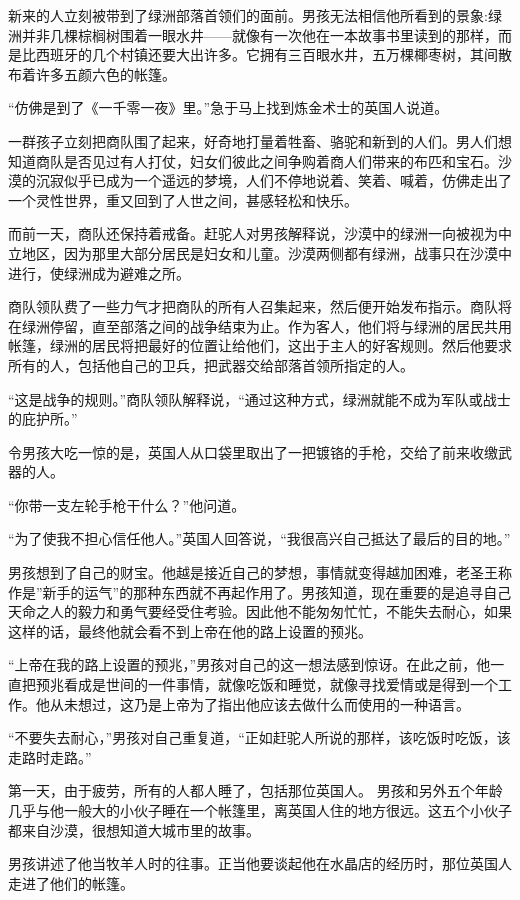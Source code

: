 \documentclass[twoside,openany]{book}
\begin{document}
新来的人立刻被带到了绿洲部落首领们的面前。男孩无法相信他所看到的景象:绿洲并非几棵棕榈树围着一眼水井——就像有一次他在一本故事书里读到的那样，而是比西班牙的几个村镇还要大出许多。它拥有三百眼水井，五万棵椰枣树，其间散布着许多五颜六色的帐篷。

“仿佛是到了《一千零一夜》里。”急于马上找到炼金术士的英国人说道。

一群孩子立刻把商队围了起来，好奇地打量着牲畜、骆驼和新到的人们。男人们想知道商队是否见过有人打仗，妇女们彼此之间争购着商人们带来的布匹和宝石。沙漠的沉寂似乎已成为一个遥远的梦境，人们不停地说着、笑着、喊着，仿佛走出了一个灵性世界，重又回到了人世之间，甚感轻松和快乐。

而前一天，商队还保持着戒备。赶驼人对男孩解释说，沙漠中的绿洲一向被视为中立地区，因为那里大部分居民是妇女和儿童。沙漠两侧都有绿洲，战事只在沙漠中进行，使绿洲成为避难之所。

商队领队费了一些力气才把商队的所有人召集起来，然后便开始发布指示。商队将在绿洲停留，直至部落之间的战争结束为止。作为客人，他们将与绿洲的居民共用帐篷，绿洲的居民将把最好的位置让给他们，这出于主人的好客规则。然后他要求所有的人，包括他自己的卫兵，把武器交给部落首领所指定的人。

“这是战争的规则。”商队领队解释说，“通过这种方式，绿洲就能不成为军队或战士的庇护所。”

令男孩大吃一惊的是，英国人从口袋里取出了一把镀铬的手枪，交给了前来收缴武器的人。

“你带一支左轮手枪干什么？”他问道。

“为了使我不担心信任他人。”英国人回答说，“我很高兴自己抵达了最后的目的地。”

男孩想到了自己的财宝。他越是接近自己的梦想，事情就变得越加困难，老圣王称作是”新手的运气”的那种东西就不再起作用了。男孩知道，现在重要的是追寻自己天命之人的毅力和勇气要经受住考验。因此他不能匆匆忙忙，不能失去耐心，如果这样的话，最终他就会看不到上帝在他的路上设置的预兆。

“上帝在我的路上设置的预兆，”男孩对自己的这一想法感到惊讶。在此之前，他一直把预兆看成是世间的一件事情，就像吃饭和睡觉，就像寻找爱情或是得到一个工作。他从未想过，这乃是上帝为了指出他应该去做什么而使用的一种语言。

“不要失去耐心，”男孩对自己重复道，“正如赶驼人所说的那样，该吃饭时吃饭，该走路时走路。”

第一天，由于疲劳，所有的人都人睡了，包括那位英国人。 男孩和另外五个年龄几乎与他一般大的小伙子睡在一个帐篷里，离英国人住的地方很远。这五个小伙子都来自沙漠，很想知道大城市里的故事。

男孩讲述了他当牧羊人时的往事。正当他要谈起他在水晶店的经历时，那位英国人走进了他们的帐篷。
\end{document}
